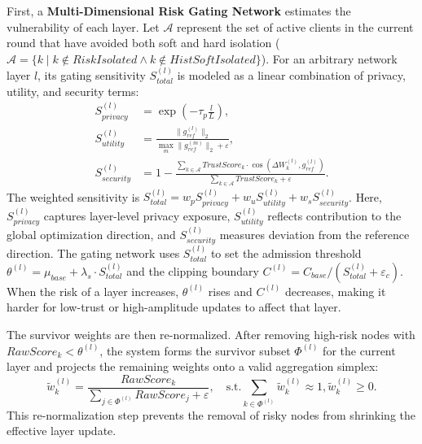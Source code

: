 \documentclass[final,5p,times,twocolumn]{elsarticle/elsarticle}
\begin{document}
First, a \textbf{Multi-Dimensional Risk Gating Network} estimates the vulnerability of each layer. Let $\mathcal{A}$ represent the set of active clients in the current round that have avoided both soft and hard isolation ($\mathcal{A} = \{k \mid k \notin RiskIsolated \land k \notin HistSoftIsolated\}$). For an arbitrary network layer $l$, its gating sensitivity $S_{total}^{(l)}$ is modeled as a linear combination of privacy, utility, and security terms:
\begin{align}
    S_{privacy}^{(l)}  & = \exp\left(-\tau_{p} \frac{l}{L}\right),                                                                                                          \\
    S_{utility}^{(l)}  & = \frac{\|g_{ref}^{(l)}\|_{2}}{\max_{m}\|g_{ref}^{(m)}\|_{2} + \varepsilon},                                                                       \\
    S_{security}^{(l)} & = 1 - \frac{\sum_{k\in\mathcal{A}}TrustScore_{k}\cdot\cos(\Delta W_{k}^{(l)}, g_{ref}^{(l)})}{\sum_{k\in\mathcal{A}}TrustScore_{k} + \varepsilon}.
\end{align}
The weighted sensitivity is $S_{total}^{(l)} = w_p S_{privacy}^{(l)} + w_u S_{utility}^{(l)} + w_s S_{security}^{(l)}$. Here, $S_{privacy}^{(l)}$ captures layer-level privacy exposure, $S_{utility}^{(l)}$ reflects contribution to the global optimization direction, and $S_{security}^{(l)}$ measures deviation from the reference direction. The gating network uses $S_{total}^{(l)}$ to set the admission threshold $\theta^{(l)} = \mu_{base} + \lambda_s \cdot S_{total}^{(l)}$ and the clipping boundary $C^{(l)} = C_{base} / (S_{total}^{(l)} + \varepsilon_c)$. When the risk of a layer increases, $\theta^{(l)}$ rises and $C^{(l)}$ decreases, making it harder for low-trust or high-amplitude updates to affect that layer.

The survivor weights are then re-normalized. After removing high-risk nodes with $RawScore_k < \theta^{(l)}$, the system forms the survivor subset $\Phi^{(l)}$ for the current layer and projects the remaining weights onto a valid aggregation simplex:
\begin{equation}
    \tilde{w}_{k}^{(l)} = \frac{RawScore_{k}}{\sum_{j\in\Phi^{(l)}}RawScore_{j} + \varepsilon}, \quad \text{s.t.} \sum_{k\in\Phi^{(l)}} \tilde{w}_{k}^{(l)} \approx 1, \tilde{w}_{k}^{(l)} \ge 0.
\end{equation}
This re-normalization step prevents the removal of risky nodes from shrinking the effective layer update.
\end{document}
